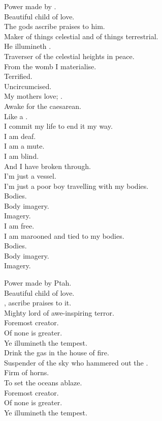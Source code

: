 Power made by . \\
Beautiful child of love. \\
The gods ascribe praises to him. \\
Maker of things celestial and of things terrestrial. \\
He illumineth . \\
Traverser of the celestial heights in peace. \\

From the womb I materialise. \\
Terrified. \\
Uncircumcised. \\
My mothers love; . \\
Awake for the caesarean. \\
Like a . \\
I commit my life to end it my way. \\
I am deaf. \\
I am a mute. \\
I am blind. \\
And I have broken through. \\

I'm just a vessel. \\
I'm just a poor boy travelling with my bodies. \\
Bodies. \\
Body imagery. \\
Imagery. \\
I am free. \\
I am marooned and tied to my bodies. \\
Bodies. \\
Body imagery. \\
Imagery. \\


Power made by Ptah. \\
Beautiful child of love. \\
, ascribe praises to it. \\
Mighty lord of awe-inspiring terror. \\
Foremost creator. \\
Of none is greater. \\
Ye illumineth the tempest. \\

Drink the gas in the house of fire. \\
Suspender of the sky who hammered out the . \\
Firm of horns. \\
To set the oceans ablaze. \\
Foremost creator. \\
Of none is greater. \\
Ye illumineth the tempest. \\

